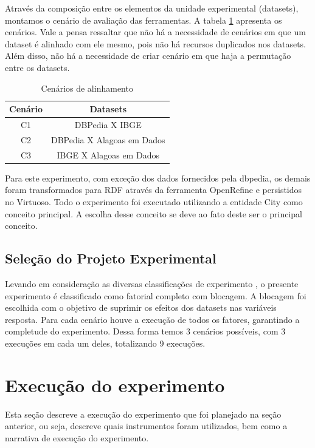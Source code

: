 Através da composição entre os elementos da unidade experimental (datasets), montamos o cenário de avaliação das ferramentas. A tabela \ref{tab:cenarios} apresenta os cenários. Vale a pensa ressaltar que não há a necessidade de cenários em que um dataset é alinhado com ele mesmo, pois não há recursos duplicados nos datasets. Além disso, não há a necessidade de criar cenário em que haja a permutação entre os datasets.

\begin{table}[h]
\centering
\caption{Cenários de alinhamento}
\label{tab:cenarios}
\begin{tabular}{|c|c|}
\hline
\textbf{Cenário} & \textbf{Datasets}          \\ \hline
C1               & DBPedia X IBGE             \\ \hline
C2               & DBPedia X Alagoas em Dados \\ \hline
C3               & IBGE X Alagoas em Dados    \\ \hline
\end{tabular}
\end{table}

Para este experimento, com exceção dos dados fornecidos pela dbpedia, os demais foram transformados para RDF através da ferramenta OpenRefine e persistidos no Virtuoso.  
Todo o experimento foi executado utilizando a entidade City como conceito principal. A escolha desse conceito se deve ao fato deste ser o principal conceito.

\subsection{Seleção do Projeto Experimental}
Levando em consideração as diversas classificações de experimento \cite{montgomery2012design}, o presente experimento é classificado como fatorial completo com blocagem. A blocagem foi escolhida com o objetivo de suprimir os efeitos dos datasets nas variáveis resposta. Para cada cenário houve a execução de todos os fatores, garantindo a completude do experimento. Dessa forma temos 3 cenários possíveis, com 3 execuções em cada um deles, totalizando 9 execuções.

\section{Execução do experimento}
Esta seção descreve a execução do experimento que foi planejado na seção anterior, ou seja, descreve quais instrumentos foram utilizados, bem como a narrativa de execução do experimento.

